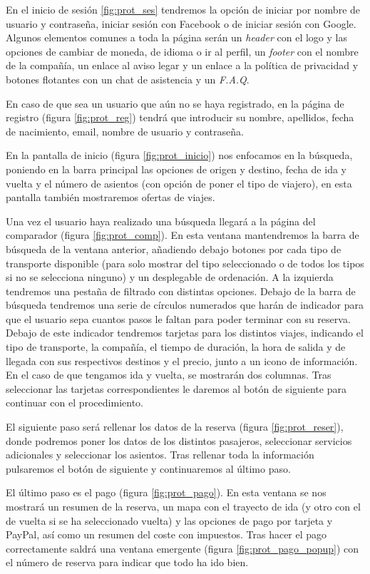 En el inicio de sesión \ref{fig:prot_ses} tendremos la opción de iniciar por
nombre de usuario y contraseña, iniciar sesión con Facebook o de iniciar sesión
con Google. Algunos elementos comunes a toda la página serán un \textit{header}
con el logo y las opciones de cambiar de moneda, de idioma o ir al perfil, un
\textit{footer} con el nombre de la compañía, un enlace al aviso legar y un
enlace a la política de privacidad y botones flotantes con un chat de
asistencia y un \textit{F.A.Q}.

En caso de que sea un usuario que aún no se haya registrado, en la página de
registro (figura \ref{fig:prot_reg}) tendrá que introducir su nombre,
apellidos, fecha de nacimiento, email, nombre de usuario y contraseña.

En la pantalla de inicio (figura \ref{fig:prot_inicio}) nos enfocamos en la
búsqueda, poniendo en la barra principal las opciones de origen y destino,
fecha de ida y vuelta y el número de asientos (con opción de poner el tipo de
viajero), en esta pantalla también mostraremos ofertas de viajes.

Una vez el usuario haya realizado una búsqueda llegará a la página del
comparador (figura \ref{fig:prot_comp}). En esta ventana mantendremos la barra
de búsqueda de la ventana anterior, añadiendo debajo botones por cada tipo de
transporte disponible (para solo mostrar del tipo seleccionado o de todos los
tipos si no se selecciona ninguno) y un desplegable de ordenación. A la
izquierda tendremos una pestaña de filtrado con distintas opciones. Debajo de
la barra de búsqueda tendremos una serie de círculos numerados que harán de
indicador para que el usuario sepa cuantos pasos le faltan para poder terminar
con su reserva. Debajo de este indicador tendremos tarjetas para los distintos
viajes, indicando el tipo de transporte, la compañía, el tiempo de duración, la
hora de salida y de llegada con sus respectivos destinos y el precio, junto a
un icono de información. En el caso de que tengamos ida y vuelta, se mostrarán
dos columnas. Tras seleccionar las tarjetas correspondientes le daremos al
botón de siguiente para continuar con el procedimiento.

El siguiente paso será rellenar los datos de la reserva (figura
\ref{fig:prot_reser}), donde podremos poner los datos de los distintos
pasajeros, seleccionar servicios adicionales y seleccionar los asientos. Tras
rellenar toda la información pulsaremos el botón de siguiente y continuaremos
al último paso.

El último paso es el pago (figura \ref{fig:prot_pago}). En esta ventana se nos
mostrará un resumen de la reserva, un mapa con el trayecto de ida (y otro con
el de vuelta si se ha seleccionado vuelta) y las opciones de pago por tarjeta y
PayPal, así como un resumen del coste con impuestos. Tras hacer el pago
correctamente saldrá una ventana emergente (figura \ref{fig:prot_pago_popup})
con el número de reserva para indicar que todo ha ido bien.

